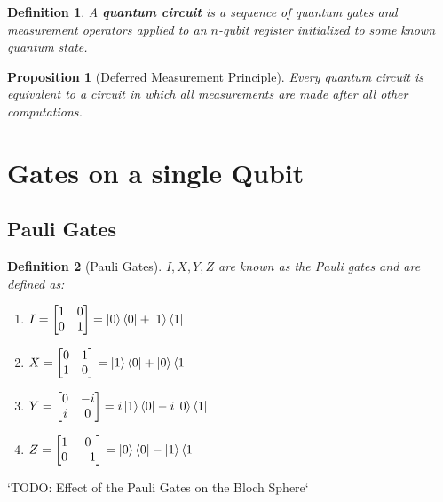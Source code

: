 \documentclass[12pt,twoside,fleqn]{report}
\theoremstyle{thmstyle}
\newtheorem{defn}{Definition}[chapter]
\newtheorem{prop}{Proposition}[chapter]
\begin{document}
\begin{defn}
    A \textbf{quantum circuit} is a sequence of quantum gates and measurement operators applied to an $n$-qubit register initialized to some known quantum state.
\end{defn}

\begin{prop}[Deferred Measurement Principle]
    Every quantum circuit is equivalent to a circuit in which all measurements are made after all other computations.
\end{prop}


\section{Gates on a single Qubit}

\subsection{Pauli Gates}
\begin{defn}[Pauli Gates]
    $I, X, Y, Z$ are known as the Pauli gates and are defined as:
    \begin{enumerate}
        \item $I = \begin{bmatrix} 1 & 0 \\ 0 & 1 \end{bmatrix} = \ket{0}\bra{0} + \ket{1}\bra{1}$
        \item $X = \begin{bmatrix} 0 & 1 \\ 1 & 0 \end{bmatrix} = \ket{1}\bra{0} + \ket{0}\bra{1}$
        \item $Y = \begin{bmatrix} 0 & -i \\ i & 0 \end{bmatrix} = i \ket{1}\bra{0} - i \ket{0}\bra{1}$
        \item $Z = \begin{bmatrix} 1 & 0 \\ 0 & -1 \end{bmatrix} = \ket{0}\bra{0} - \ket{1}\bra{1}$
    \end{enumerate}
\end{defn}

`TODO: Effect of the Pauli Gates on the Bloch Sphere`
\end{document}
